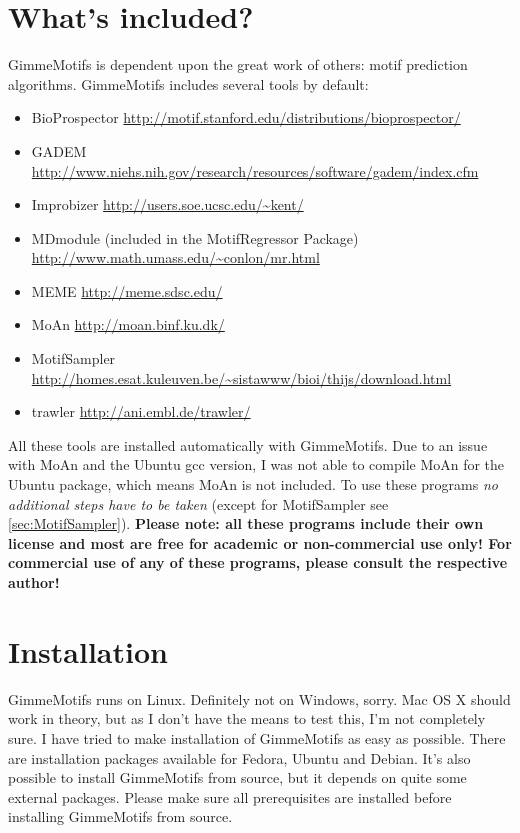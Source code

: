 \documentclass[11pt]{article}
\begin{document}
\section{What's included?}
GimmeMotifs is dependent upon the great work of others: motif prediction algorithms. GimmeMotifs includes several tools by default:
\begin{itemize}
\item BioProspector \cite{liu_bioprospector:_2001} \url{http://motif.stanford.edu/distributions/bioprospector/}
\item GADEM \cite{li_gadem:_2009} \url{http://www.niehs.nih.gov/research/resources/software/gadem/index.cfm}
\item Improbizer \cite{ao_environmentally_2004} \url{http://users.soe.ucsc.edu/~kent/}
\item MDmodule \cite{liu_algorithm_2002} (included in the MotifRegressor Package) \url{http://www.math.umass.edu/~conlon/mr.html}
\item MEME \cite{bailey_meme_2009} \url{http://meme.sdsc.edu/}
\item MoAn \cite{valen_discovery_2009} \url{http://moan.binf.ku.dk/}
\item MotifSampler \cite{thijs_higher-order_2001,thijs_gibbs_2002} \url{http://homes.esat.kuleuven.be/~sistawww/bioi/thijs/download.html}
\item trawler \cite{ettwiller_trawler:_2007} \url{http://ani.embl.de/trawler/}
\end{itemize}
All these tools are installed automatically with GimmeMotifs. Due to an issue with MoAn and the Ubuntu gcc version, I was not able to compile MoAn for the Ubuntu package, which means MoAn is not included. To use these programs \emph{no additional steps have to be taken} (except for MotifSampler see \ref{sec:MotifSampler}). \textbf{Please note: all these programs include their own license and most are free for academic or non-commercial use only! For commercial use of any of these programs, please consult the respective author!}

\section{Installation}
GimmeMotifs runs on Linux. Definitely not on Windows, sorry. Mac OS X should work in theory, but as I don't have the means to test this, I'm not completely sure. I have tried to make installation of GimmeMotifs as easy as possible. There are installation packages available for Fedora, Ubuntu and Debian. It's also possible to install GimmeMotifs from source, but it depends on quite some external packages. Please make sure all prerequisites are installed before installing GimmeMotifs from source. 
\end{document}
